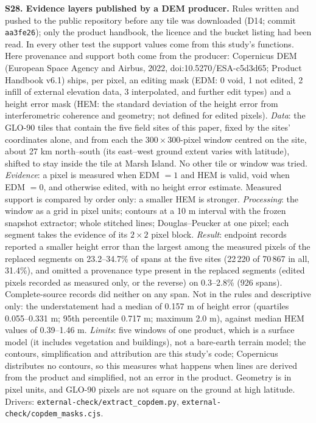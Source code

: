 \documentclass[11pt]{article}
\begin{document}
\vspace{4mm}
\noindent\textbf{S28. Evidence layers published by a DEM producer.} Rules written and pushed to the public repository before any tile was downloaded (D14; commit \texttt{aa3fe26}); only the product handbook, the licence and the bucket listing had been read. In every other test the support values come from this study's functions. Here provenance and support both come from the producer: Copernicus DEM (European Space Agency and Airbus, 2022, doi:10.5270/ESA-c5d3d65; Product Handbook v6.1) ships, per pixel, an editing mask (EDM: 0 void, 1 not edited, 2 infill of external elevation data, 3 interpolated, and further edit types) and a height error mask (HEM: the standard deviation of the height error from interferometric coherence and geometry; not defined for edited pixels). \emph{Data}: the GLO-90 tiles that contain the five field sites of this paper, fixed by the sites' coordinates alone, and from each the $300\times300$-pixel window centred on the site, about 27 km north--south (its east--west ground extent varies with latitude), shifted to stay inside the tile at Marsh Island. No other tile or window was tried. \emph{Evidence}: a pixel is measured when EDM $=1$ and HEM is valid, void when EDM $=0$, and otherwise edited, with no height error estimate. Measured support is compared by order only: a smaller HEM is stronger. \emph{Processing}: the window as a grid in pixel units; contours at a 10 m interval with the frozen snapshot extractor; whole stitched lines; Douglas--Peucker at one pixel; each segment takes the evidence of its $2\times2$ pixel block. \emph{Result}: endpoint records reported a smaller height error than the largest among the measured pixels of the replaced segments on 23.2--34.7\% of spans at the five sites (22\,220 of 70\,867 in all, 31.4\%), and omitted a provenance type present in the replaced segments (edited pixels recorded as measured only, or the reverse) on 0.3--2.8\% (926 spans). Complete-source records did neither on any span. Not in the rules and descriptive only: the understatement had a median of 0.157 m of height error (quartiles 0.055--0.331 m; 95th percentile 0.717 m; maximum 2.0 m), against median HEM values of 0.39--1.46 m. \emph{Limits}: five windows of one product, which is a surface model (it includes vegetation and buildings), not a bare-earth terrain model; the contours, simplification and attribution are this study's code; Copernicus distributes no contours, so this measures what happens when lines are derived from the product and simplified, not an error in the product. Geometry is in pixel units, and GLO-90 pixels are not square on the ground at high latitude. Drivers: \texttt{external-check/extract\_copdem.py}, \texttt{external-check/copdem\_masks.cjs}.
\end{document}
